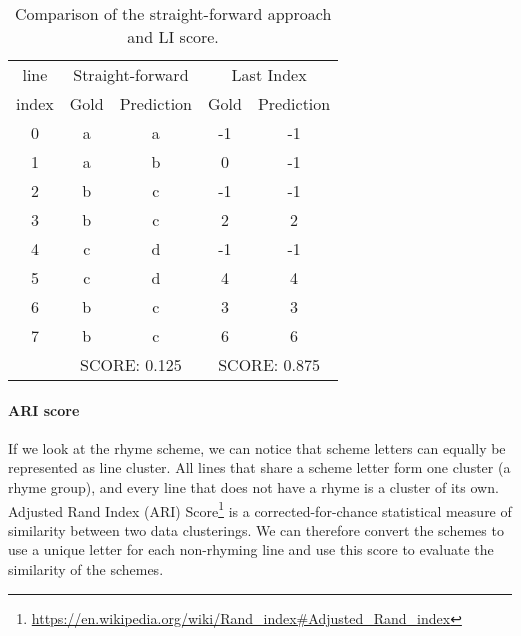 \begin{table}[h!]
	\centering
	\begin{tabular}{c cc cc}\toprule
	 line &
		\multicolumn{2}{c}{Straight-forward} &
		\multicolumn{2}{c}{Last Index}\\\cmidrule(r){2-3}\cmidrule(l){4-5}
      index    & Gold & Prediction & Gold & Prediction\\\midrule
		0 & \color{OliveGreen}a		&\color{OliveGreen}a		&\color{OliveGreen}-1		&\color{OliveGreen}-1	\\
		1 & \color{Bittersweet}a		&\color{Bittersweet}b		&\color{Bittersweet}0		&\color{Bittersweet}-1	\\
		2 & \color{Bittersweet}b		&\color{Bittersweet}c		&\color{OliveGreen}-1		&\color{OliveGreen}-1\\
		3 & \color{Bittersweet}b		&\color{Bittersweet}c		&\color{OliveGreen}2		&\color{OliveGreen}2	\\
		4 & \color{Bittersweet}c		&\color{Bittersweet}d		&\color{OliveGreen}-1		&\color{OliveGreen}-1	\\
		5 & \color{Bittersweet}c		&\color{Bittersweet}d		&\color{OliveGreen}4		&\color{OliveGreen}4	\\
		6 & \color{Bittersweet}b		&\color{Bittersweet}c		&\color{OliveGreen}3		&\color{OliveGreen}3	\\
		7 & \color{Bittersweet}b		&\color{Bittersweet}c		&\color{OliveGreen}6		&\color{OliveGreen}6	\\
		\midrule
		& \multicolumn{2}{c}{SCORE: 0.125} &
		\multicolumn{2}{c}{SCORE: 0.875}\\\bottomrule
	\end{tabular}
	\caption[Comparison of the straight-forward approach and LI score.]{Comparison of the straight-forward approach and LI score.}
	\label{LI_score_example}
\end{table}


\paragraph{ARI score} If we look at the rhyme scheme, we can notice that scheme letters can equally be represented as line cluster. All lines that share a scheme letter form one cluster (a rhyme group), and every line that does not have a rhyme is a cluster of its own. Adjusted Rand Index (ARI) Score\footnote{\url{https://en.wikipedia.org/wiki/Rand\_index\#Adjusted\_Rand\_index}} is a corrected-for-chance statistical measure of similarity between two data clusterings. We can therefore convert the schemes to use a unique letter for each non-rhyming line and use this score to evaluate the similarity of the schemes. 

